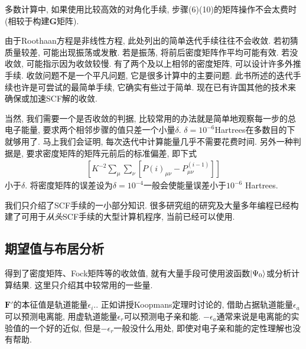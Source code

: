 多数计算中, 如果使用比较高效的对角化手续, 步骤(6)(10)的矩阵操作不会太费时(相较于构建$\mathbf{G}$矩阵).

由于Roothaan方程是非线性方程, 此处列出的简单迭代手续往往不会收敛. 若初猜质量较差, 可能出现振荡或发散. 若是振荡, 将前后密度矩阵作平均可能有效. 若没收敛, 可能指示因为收敛较慢. 有了两个及以上相邻的密度矩阵, 可以设计许多外推手续. 收敛问题不是一个平凡问题, 它是很多计算中的主要问题. 此书所述的迭代手续也许是可尝试的最简单手续, 它确实有些过于简单. 现在已有许国其他的技术来确保或加速SCF解的收敛.

当然, 我们需要一个是否收敛的判据, 比较常用的办法就是简单地观察每一步的总电子能量, 要求两个相邻步骤的值只差一个小量$\delta$. $\delta=10^{-6}$Hartrees在多数目的下就够用了. 马上我们会证明, 每次迭代中计算能量几乎不需要花费时间. 另外一种判据是, 要求密度矩阵的矩阵元前后的标准偏差, 即下式
\begin{align*}
\left[ K^{-2}\sum_\mu\sum_\nu[P{(i)}_{\mu\nu}-P^{(i-1)}_{\mu\nu} ] \right]
\end{align*} 
小于$\delta$. 将密度矩阵的误差设为$\delta=10^{-4}$一般会使能量误差小于$10^{-6}$ Hartrees.

我们只介绍了SCF手续的一小部分知识. 很多研究组的研究及大量多年编程已经构建了可用于\emph{从头}SCF手续的大型计算机程序, 当前已经可以使用.
\subsection{期望值与布居分析}
得到了密度矩阵、Fock矩阵等的收敛值, 就有大量手段可使用波函数$\Ket{\Psi_0}$或分析计算结果. 这里只介绍其中较常用的一些量.

$\mathbf{F'}$的本征值是轨道能量$\epsilon_i$.. 正如讲授Koopmans定理时讨论的, 借助占据轨道能量$\epsilon_a$可以预测电离能, 用虚轨道能量$\epsilon_r$可以预测电子亲和能. $-\epsilon_a$通常来说是电离能的实验值的一个好的近似, 但是$-\epsilon_r$一般没什么用处, 即使对电子亲和能的定性理解也没有帮助.

